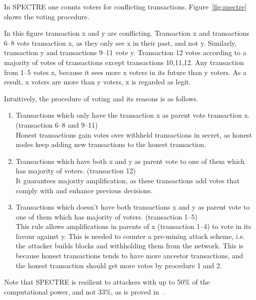 \documentclass[a4paper,10pt,twocolumn]{article}
\begin{document}
 In SPECTRE one counts voters for conflicting transactions.
 Figure~\ref{fig:spectre} shows the voting procedure. 
 
 In this figure transaction x and y are conflicting.
 Transaction x and transactions 6--8 vote transaction x, as they only see x in their past, and not y. Similarly, transaction y and transactions 9--11 vote y.
 Transaction 12 votes according to a majority of votes of transactions except transactions 10,11,12. Any transaction from 1--5 votes x,
 because it sees more x voters in its future than y voters. As a result, x voters are more than y voters, x is regarded as legit. 

 Intuitively,  the procedure of voting and its reasons is as follows.

 \vspace{-0.5\baselineskip}
 \begin{enumerate}
	 \setlength\itemsep{0em}
\item   Transactions which only have the transaction x as parent vote transaction x. (transaction 6--8 and 9--11) \\
Honest transactions gain votes over withheld transactions in secret, as honest nodes keep adding new transactions to the honest transaction.
 \item  Transactions which have both x and y as parent vote to one of them which has majority of voters. (transaction 12)\\
 It guarantees majority amplification, as these transactions add votes
 that comply with and enhance previous decisions. 
 \item   Transactions which doesn't have both transactions x and y as parent vote to one of them which has majority of voters. (transaction 1--5)\\
 This rule allows amplifications in parents of x (transaction 1--4) to vote in its favour against y.
 This is needed to counter a pre-mining attack scheme, i.e. the attacker builds blocks and withholding them from the network.
 This is because honest transactions tends to have more ancestor transactions, and the honest transaction
 should get more votes by procedure 1 and 2.
 \end{enumerate}

Note that SPECTRE is resilient to attackers with up to 50\% of the computational power, and not 33\%, as is proved in~\cite{spectre}.
\end{document}

